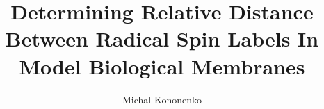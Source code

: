 \documentclass{workreport}
\title{
    Determining Relative Distance Between Radical Spin Labels
    In Model Biological Membranes
}
\author{Michal Kononenko}
\begin{document}
\maketitlepage
\end{document}

